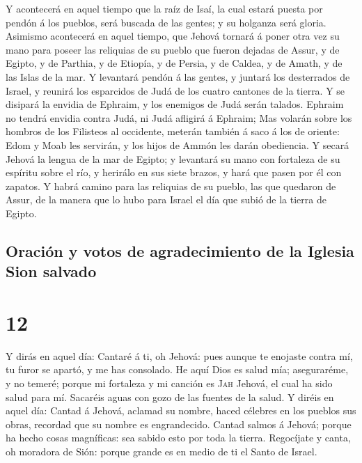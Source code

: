  Y acontecerá en aquel tiempo que la raíz de Isaí, la
cual estará puesta por pendón á los pueblos, será buscada de las gentes;
y su holganza será gloria.  Asimismo acontecerá en aquel
tiempo, que Jehová tornará á poner otra vez su mano para poseer las
reliquias de su pueblo que fueron dejadas de Assur, y de Egipto, y de
Parthia, y de Etiopía, y de Persia, y de Caldea, y de Amath, y de las
Islas de la mar.  Y levantará pendón á las gentes, y
juntará los desterrados de Israel, y reunirá los esparcidos de Judá de
los cuatro cantones de la tierra.  Y se disipará la
envidia de Ephraim, y los enemigos de Judá serán talados. Ephraim no
tendrá envidia contra Judá, ni Judá afligirá á Ephraim; 
Mas volarán sobre los hombros de los Filisteos al occidente, meterán
también á saco á los de oriente: Edom y Moab les servirán, y los hijos
de Ammón les darán obediencia.  Y secará Jehová la lengua
de la mar de Egipto; y levantará su mano con fortaleza de su espíritu
sobre el río, y herirálo en sus siete brazos, y hará que pasen por él
con zapatos.  Y habrá camino para las reliquias de su
pueblo, las que quedaron de Assur, de la manera que lo hubo para Israel
el día que subió de la tierra de Egipto.

\hypertarget{oraciuxf3n-y-votos-de-agradecimiento-de-la-iglesia-sion-salvado}{%
\subsection{Oración y votos de agradecimiento de la Iglesia Sion
salvado}\label{oraciuxf3n-y-votos-de-agradecimiento-de-la-iglesia-sion-salvado}}

\hypertarget{section-23-12}{%
\section{12}\label{section-23-12}}

 Y dirás en aquel día: Cantaré á ti, oh Jehová: pues
aunque te enojaste contra mí, tu furor se apartó, y me has consolado.
 He aquí Dios es salud mía; aseguraréme, y no temeré;
porque mi fortaleza y mi canción es \textsc{Jah} Jehová, el cual ha sido
salud para mí.  Sacaréis aguas con gozo de las fuentes de
la salud.  Y diréis en aquel día: Cantad á Jehová, aclamad
su nombre, haced célebres en los pueblos sus obras, recordad que su
nombre es engrandecido.  Cantad salmos á Jehová; porque ha
hecho cosas magníficas: sea sabido esto por toda la tierra.
 Regocíjate y canta, oh moradora de Sión: porque grande es
en medio de ti el Santo de Israel.

